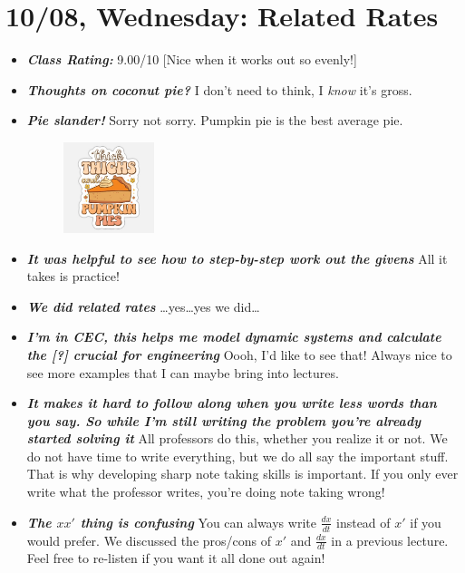 \documentclass[11pt,letterpaper]{article}
\begin{document}
\newpage
\section*{10/08, Wednesday: Related Rates\label{10-08}}

\begin{itemize}
\item {\bfseries\itshape Class Rating:} 9.00/10 [Nice when it works out so evenly!]

\item {\bfseries\itshape Thoughts on coconut pie?} I don't need to think, I \textit{know} it's gross. 

\item {\bfseries\itshape Pie slander!} Sorry not sorry. Pumpkin pie is the best average pie.
	\begin{figure}[H]
	\centering
	\includegraphics[width=0.25\textwidth]{images/pie.jpg}
	\end{figure}

\item {\bfseries\itshape It was helpful to see how to step-by-step work out the givens} All it takes is practice!

\item {\bfseries\itshape We did related rates} \dots yes\dots yes we did\dots

\item {\bfseries\itshape I'm in CEC, this helps me model dynamic systems and calculate the [?] crucial for engineering} Oooh, I'd like to see that! Always nice to see more examples that I can maybe bring into lectures.

\item {\bfseries\itshape It makes it hard to follow along when you write less words than you say. So while I'm still writing the problem you're already started solving it} All professors do this, whether you realize it or not. We do not have time to write everything, but we do all say the important stuff. That is why developing sharp note taking skills is important. If you only ever write what the professor writes, you're doing note taking wrong!

\item {\bfseries\itshape The $xx'$ thing is confusing} You can always write $\frac{dx}{dt}$ instead of $x'$ if you would prefer. We discussed the pros/cons of $x'$ and $\frac{dx}{dt}$ in a previous lecture. Feel free to re-listen if you want it all done out again!
\end{itemize}
\end{document}
